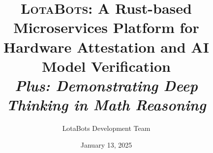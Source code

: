 \documentclass[11pt]{article}
\newcommand{\sysname}{\textsc{LotaBots}}
\begin{document}
\title{\sysname: A Rust-based Microservices Platform for \\
Hardware Attestation and AI Model Verification \\[6pt]
\large \textit{Plus: Demonstrating Deep Thinking in Math Reasoning}}
\author{LotaBots Development Team}
\date{January 13, 2025}

\maketitle











\end{document}
